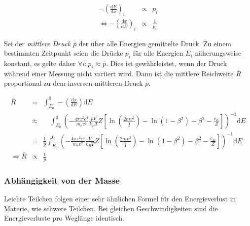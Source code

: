 \documentclass[12pt,a4paper]{scrartcl}
\numberwithin{equation}{section} %
\renewcommand{\[}{} %
\renewcommand{\]}{\noindent} %
\begin{document}
\[
\begin{eqnarray}
    -\left(\frac{\mathrm dE}{\mathrm dx}\right)_i &\propto& p_i \\
    \Leftrightarrow -\left(\frac{\mathrm dx}{\mathrm dE}\right)_i
        &\propto& \frac{1}{p_i}
\end{eqnarray}
\]

Sei der \emph{mittlere Druck} \(\bar p\) der über alle Energien
gemittelte Druck. Zu einem bestimmten Zeitpunkt seien die Drücke \(p_i\)
für alle Energien \(E_i\) näherungsweise konstant, es gelte daher
\(\forall i: p_i \approx \bar p\). Dies ist gewährleistet, wenn der
Druck während einer Messung nicht variiert wird. Dann ist die mittlere
Reichweite \(\bar R\) proportional zu dem inversen mittleren Druck
\(\bar p\).

\[
\begin{eqnarray}
    \bar{R} &=&
        \int_{E_0}^{0} -\left(\frac{\mathrm dx}{\mathrm dE}\right) \mathrm dE \\
        &\approx&
            \quad
            \int_{E_0}^{0}
                \left(
                - \frac{4\pi z^2 e^4}{m_e v^2}
                \frac{\bar pV}{k_BT}
                Z\left[
                    \ln\left(\frac{2mv^2}{\bar I}\right)
                    - \ln\left(1 - \beta^2\right)
                    - \beta^2
                    - \frac{c_K}{Z}
                \right]
            \right)^{-1}
            \mathrm dE \\
        &=&
            \frac{1}{\bar p}
            \int_{E_0}^{0}
                \left(
                - \frac{4\pi z^2 e^4}{m_e v^2}
                \frac{V}{k_BT}
                Z\left[
                    \ln\left(\frac{2mv^2}{\bar I}\right)
                    - \ln\left(1 - \beta^2\right)
                    - \beta^2
                    - \frac{c_K}{Z}
                \right]
            \right)^{-1}
            \mathrm dE \\
    \Rightarrow \bar R &\propto& \frac{1}{\bar p}
\end{eqnarray}
\]

\hypertarget{abhuxe4ngigkeit-von-der-masse}{%
\subsubsection{Abhängigkeit von der
Masse}\label{abhuxe4ngigkeit-von-der-masse}}

Leichte Teilchen folgen einer sehr ähnlichen Formel für den
Energieverlust in Materie, wie schwere Teilchen. Bei gleichen
Geschwindigkeiten sind die Energieverluste pro Weglänge identisch.
\end{document}
